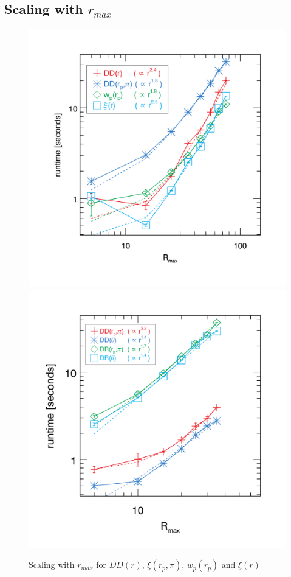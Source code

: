 \documentclass[preprint,authoryear,12pt]{elsarticle}
\newcommand{\rmax}{\ensuremath{{r_{max}}}\xspace}
\newcommand{\xir}{\ensuremath{{DD(r)}}\xspace}
\newcommand{\xiofr}{\ensuremath{{\xi(r)}}\xspace}
\newcommand{\wprp}{\ensuremath{{w_p(r_p)}}\xspace}
\newcommand{\xirppi}{\ensuremath{{\xi(r_p,\pi)}}\xspace}
\begin{document}
\subsection{Scaling with \rmax}
\begin{figure}[htbp]
\includegraphics[clip=true,width=0.5\linewidth]{timings_Mr19_rmax}%
\includegraphics[clip=true,width=0.5\linewidth]{timings_Mr19_mocks_rmax}
\caption{Scaling with \rmax for \xir, \xirppi, \wprp and \xiofr}
\label{fig:scaling_rmax}
\end{figure}
\end{document}
